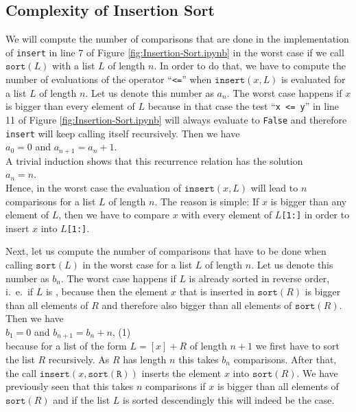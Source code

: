 \subsection{Complexity of Insertion Sort}
We will compute the number of comparisons that are done in the implementation of \texttt{insert}
in line 7 of Figure \ref{fig:Insertion-Sort.ipynb} in the worst case if we call $\texttt{sort}(L)$ with a list
$L$ of length $n$. In order to do that, 
we have to compute the number of evaluations of the operator ``\texttt{<=}'' when 
 $\texttt{insert}(x,L)$ is evaluated for a list $L$ of length $n$.  Let us denote this number as 
$a_n$.  The worst case happens if $x$ is bigger than every element of $L$ because in that case the
test ``\texttt{x <= y}'' in line 11 of Figure \ref{fig:Insertion-Sort.ipynb} will always evaluate to
\texttt{False} and therefore \texttt{insert} will keep calling itself recursively.
Then we have
\\[0.2cm]
\hspace*{1.3cm}
$a_0 = 0$ \quad and \quad $a_{n+1} = a_n + 1$. 
\\[0.2cm]
A trivial induction shows that this recurrence relation has the solution
\\[0.2cm]
\hspace*{1.3cm} 
$a_n = n$.
\\[0.2cm]
Hence, in the worst case the evaluation of $\mathtt{insert}(x,L)$ will lead to $n$ comparisons for a list
$L$ of length $n$.  The reason is simple:  If $x$ is bigger than any element of $L$, then we have to
compare $x$ with every element of \texttt{$L$[1:]} in order to insert $x$ into \texttt{$L$[1:]}.

Next, let us compute the number of comparisons that have to be done when calling
$\texttt{sort}(L)$ in the worst case for a list  $L$ of length $n$.  Let us denote this number as
$b_n$. The worst case happens if $L$ is already sorted in reverse order, i.~e.~if $L$ is
, because then the element $x$ that is inserted in
$\texttt{sort}(R)$ is bigger than all elements 
of $R$ and therefore also bigger than all elements of $\texttt{sort}(R)$.  Then we have \\[0.2cm]
\hspace*{1.3cm}
 $b_1 = 0$ \quad and \quad $b_{n+1} = b_n + n$, \hspace*{\fill} (1)
\\[0.2cm]
because for a list of the form $L = [x] + R$ of length $n+1$ we first have to sort the list $R$
recursively.  As $R$ has length $n$ this takes $b_n$ comparisons.  After that, the call
$\mathtt{insert}(x, \mathtt{sort(R)})$ 
inserts the element $x$ into $\mathtt{sort}(R)$.  We have previously seen that this takes $n$
comparisons if $x$ is bigger than all elements of $\mathtt{sort}(R)$ and if the list $L$ is sorted
descendingly this will indeed be the case.

